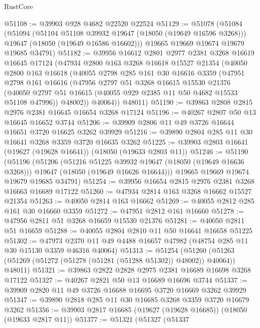 \begin{lexlean}{RustCore}
\begin{coremodule}
@51108 := @39903 @928 @4682 @22520 @22524
@51129 := @51078
    (@51084
      (@51094
        (@51104 @51108 @39932 @19647 (@18050 (@19649 @16596 @3268)))
        @19647
        (@18050 (@19649 @16586 @16602)))
      @19665
      @19669
      @19674
      @19679
      @19685
      @34791)
@51182 := @39956
    @16612
    @2801
    @2977
    @2381
    @3268
    @16619
    @16645
    @17124
    (@47934
      @2800
      @163
      @3268
      @16618
      @15527
      @21354
      (@40050
        @2800
        @163
        @16618
        (@40055
          @2798
          @285
          @161
          @30
          @16616
          @3359
          (@47951
            @2798
            @161
            @16616
            (@47956
              @2797
              @51
              @3268
              @16615
              @15530
              @21376
              (@40050 @2797 @51 @16615 (@40055 @929 @2385 @11 @50 @4682 @15533 @51108 @47996))
              @48002))
          @40064))
      @48011)
@51190 := @39863 @2808 @2815 @2976 @2381 @16645 @16654 @3268 @17124
@51196 := @40267 @2807 @50 @13 @16645 @16652 @3744
@51206 := @39909 @2806 @11 @49 @3726 @16644 @16651 @3720 @16625 @3262 @39929
@51216 := @39890 @2804 @285 @11 @30 @16641 @3268 @3359 @3720 @16635 @3262
@51225 := @39903 @2803 @16641 (@19627 (@19628 @16641)) (@18050 (@19633 @2803 @11))
@51246 := @51190
    (@51196
      (@51206
        (@51216 @51225 @39932 @19647 (@18050 (@19649 @16636 @3268)))
        @19647
        (@18050 (@19649 @16626 @16644)))
      @19665
      @19669
      @19674
      @19679
      @19685
      @34791)
@51254 := @39956 @16654 @2815 @2976 @2381 @3268 @16663 @16689 @17122
@51260 := @47934 @2814 @163 @3268 @16662 @15527 @21354
@51263 := @40050 @2814 @163 @16662
@51269 := @40055 @2812 @285 @161 @30 @16660 @3359
@51272 := @47951 @2812 @161 @16660
@51278 := @47956 @2811 @51 @3268 @16659 @15530 @21376
@51281 := @40050 @2811 @51 @16659
@51288 := @40055 @2804 @2810 @11 @50 @16641 @16658 @51225
@51302 := @47973 @2370 @11 @49 @4488 @16657 @47982 (@48754 @285 @11 @30 @15130 @3359 @46316 @40064)
@51313 := @51254
    (@51260 (@51263 (@51269 (@51272 (@51278 (@51281 (@51288 @51302)) @48002)) @40064)) @48011)
@51321 := @39863 @2822 @2828 @2975 @2381 @16689 @16698 @3268 @17122
@51327 := @40267 @2821 @50 @13 @16689 @16696 @3744
@51337 := @39909 @2820 @11 @49 @3726 @16688 @16695 @3720 @16669 @3262 @39929
@51347 := @39890 @2818 @285 @11 @30 @16685 @3268 @3359 @3720 @16679 @3262
@51356 := @39903 @2817 @16685 (@19627 (@19628 @16685)) (@18050 (@19633 @2817 @11))
@51377 := @51321
    (@51327
      (@51337

\end{coremodule}
\end{lexlean}
